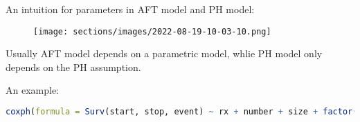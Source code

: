     An intuition for parameters in AFT model and PH model:
\begin{figure}[H]
    \centering
    \texttt{[image: sections/images/2022-08-19-10-03-10.png]}
    \label{}
\end{figure}

    Usually AFT model depends on a parametric model, whlie PH model only depends on the PH assumption.



\begin{rcode}
    An example:
\begin{lstlisting}[language=R]
coxph(formula = Surv(start, stop, event) ~ rx + number + size + factor(enum), data = bladder2)
\end{lstlisting}
\end{rcode}
    
    


    
